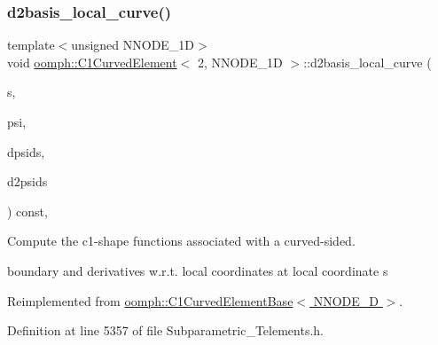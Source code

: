 \subsubsection{\texorpdfstring{d2basis\+\_\+local\+\_\+curve()}{d2basis\_local\_curve()}}
{\footnotesize\ttfamily template$<$unsigned N\+N\+O\+D\+E\+\_\+1D$>$ \\
void \hyperlink{classoomph_1_1C1CurvedElement}{oomph\+::\+C1\+Curved\+Element}$<$ 2, N\+N\+O\+D\+E\+\_\+1D $>$\+::d2basis\+\_\+local\+\_\+curve (\begin{DoxyParamCaption}\item[{const \hyperlink{classoomph_1_1Vector}{Vector}$<$ double $>$ \&}]{s,  }\item[{\hyperlink{classoomph_1_1Shape}{Shape} \&}]{psi,  }\item[{\hyperlink{classoomph_1_1DShape}{D\+Shape} \&}]{dpsids,  }\item[{\hyperlink{classoomph_1_1DShape}{D\+Shape} \&}]{d2psids }\end{DoxyParamCaption}) const\hspace{0.3cm}{\ttfamily [inline]}, {\ttfamily [virtual]}}



Compute the c1-\/shape functions associated with a curved-\/sided. 

boundary and derivatives w.\+r.\+t. local coordinates at local coordinate s 

Reimplemented from \hyperlink{classoomph_1_1C1CurvedElementBase_a7bcb3462fd699a3b3f6a8336ec8ed62e}{oomph\+::\+C1\+Curved\+Element\+Base$<$ N\+N\+O\+D\+E\+\_\+D $>$}.



Definition at line 5357 of file Subparametric\+\_\+\+Telements.\+h.

\mbox{\label{classoomph_1_1C1CurvedElement_3_012_00_01NNODE__1D_01_4_a4fc4db790fca7513a3e8ceb0a7a61507}} 

